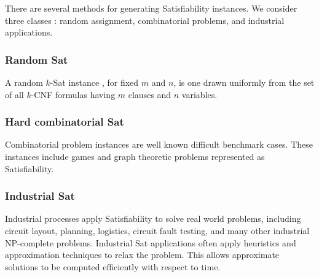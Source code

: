 There are several methods for generating {\sc Satisfiability} instances.  We consider three classes \cite{satcompetition}: random assignment, combinatorial problems, and industrial applications.
	
\subsubsection{Random {\sc Sat}}
A random $k$-{\sc Sat} instance \cite{wilsonKsat}, for fixed $m$ and $n$, is one drawn uniformly from the set of all $k$-CNF formulas having $m$ clauses and $n$ variables.

		

\subsubsection{Hard combinatorial {\sc Sat}}

Combinatorial problem instances are well known difficult benchmark cases.  These instances include games and graph theoretic problems represented as {\sc Satisfiability}. 
		
\subsubsection{Industrial {\sc Sat}}

Industrial processes apply {\sc Satisfiability} to solve real world problems, including circuit layout, planning, logistics, circuit fault testing, and many other industrial \textsf{NP-complete} problems.  Industrial {\sc Sat} applications often apply heuristics and approximation techniques to relax the problem.  This allows approximate solutions to be computed efficiently with respect to time.
